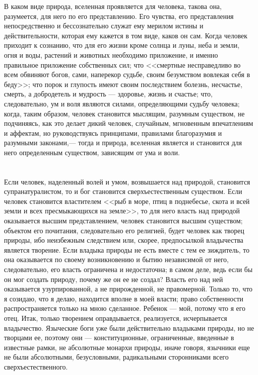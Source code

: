 \documentclass[12pt]{article}
\begin{document}
В каком виде природа, вселенная проявляется для человека, такова она, разумеется, для него по его представлению. Его чувства, его представления непосредственно и бессознательно служат ему мерилом истины и действительности, которая ему кажется в том виде, каков он сам. Когда человек приходит к сознанию, что для его жизни кроме солнца и луны, неба и земли, огня и воды, растений и животных необходимо приложение, и именно правильное приложение собственных сил; что <<смертные несправедливо во всем обвиняют богов, сами, наперекор судьбе, своим безумством вовлекая себя в беду>>; что порок и глупость имеют своим последствием болезнь, несчастье, смерть, а добродетель и мудрость --- здоровье, жизнь и счастье; что, следовательно, ум и воля являются силами, определяющими судьбу человека; когда, таким образом, человек становится мыслящим, разумным существом, не подчиняясь, как это делает дикий человек, случайным, мгновенным впечатлениям и аффектам, но руководствуясь принципами, правилами благоразумия и разумными законами,--- тогда и природа, вселенная является и становится для него определенным существом, зависящим от ума и воли.



\section{}

Если человек, наделенный волей и умом, возвышается над природой, становится супранатуралистом, то и бог становится сверхъестественным существом. Если человек становится властителем <<рыб в море, птиц в поднебесье, скота и всей земли и всех пресмыкающихся на земле>>, то для него власть над природой оказывается высшим представлением, человек становится высшим существом; объектом его почитания, следовательно его религией, будет человек как творец природы, ибо неизбежным следствием или, скорее, предпосылкой владычества является творение. Если владыка природы не есть вместе с тем ее зиждитель, то она оказывается по своему возникновению и бытию независимой от него, следовательно, его власть ограничена и недостаточна; в самом деле, ведь если бы он мог создать природу, почему же он ее не создал? Власть его над ней оказывается узурпированной, а не прирожденной, не правомерной. Только то, что я созидаю, что я делаю, находится вполне в моей власти; право собственности распространяется только на мною сделанное. Ребенок --- мой, потому что я его отец. Итак, только творением оправдывается, реализуется, исчерпывается владычество. Языческие боги уже были действительно владыками природы, но не творцами ее, поэтому они --- конституционные, ограниченные, введенные в известные рамки, не абсолютные монархи природы, иначе говоря, язычники еще не были абсолютными, безусловными, радикальными сторонниками всего сверхъестественного.
\end{document}

